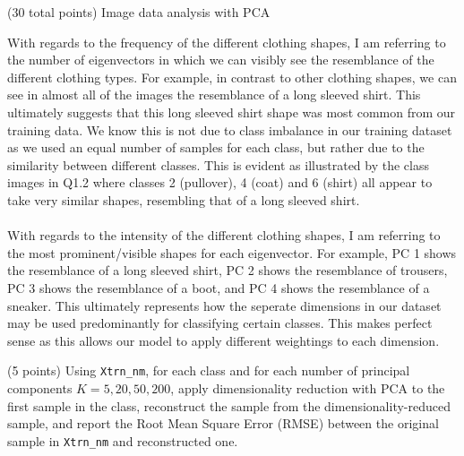 \documentclass[12pt]{article}
\begin{document}
\begin{question}{(30 total points) Image data analysis with PCA}
\begin{subquestion}
\begin{answerbox}{35em}
{        With regards to the frequency of the different clothing shapes, I am referring to the number of eigenvectors in which we can visibly see the resemblance of the different clothing types. For example, in contrast to other clothing shapes, we can see in almost all of the images the resemblance of a long sleeved shirt. This ultimately suggests that this long sleeved shirt shape was most common from our training data. We know this is not due to class imbalance in our training dataset as we used an equal number of samples for each class, but rather due to the similarity between different classes. This is evident as illustrated by the class images in Q1.2 where classes 2 (pullover), 4 (coat) and 6 (shirt) all appear to take very similar shapes, resembling that of a long sleeved shirt.\\
\\
        With regards to the intensity of the different clothing shapes, I am referring to the most prominent/visible shapes for each eigenvector. For example, PC 1 shows the resemblance of a long sleeved shirt, PC 2 shows the resemblance of trousers, PC 3 shows the resemblance of a boot, and PC 4 shows the resemblance of a sneaker. This ultimately represents how the seperate dimensions in our dataset may be used predominantly for classifying certain classes. This makes perfect sense as this allows our model to apply different weightings to each dimension.
}
      \end{answerbox}
  


   \end{subquestion}

   \begin{subquestion}{(5 points)
       Using \texttt{Xtrn\_nm}, 
       for each class and for each number of principal components $K =
       5, 20, 50, 200$, apply dimensionality reduction with PCA to the
       first sample in the class, reconstruct the sample from the
       dimensionality-reduced sample, and 
       report the Root Mean Square Error (RMSE) between the
       original sample in {\tt Xtrn\_nm} and reconstructed one.
     } \label{Q1.6}

     


\end{subquestion}
\end{question}
\end{document}
